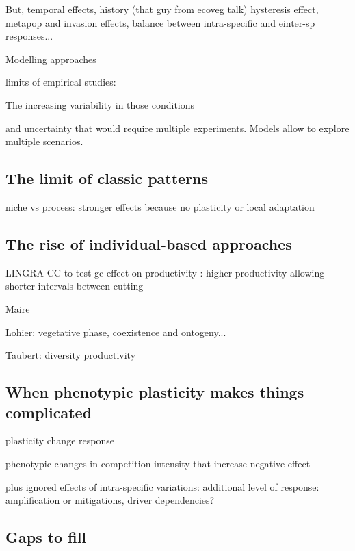  But, temporal effects, history (that guy from ecoveg talk) hysteresis effect, metapop and invasion effects, balance between intra-specific and einter-sp responses...
 
 Modelling approaches   
 
 
limits of empirical studies: \parencite{merila_climate_2014}

 
 \parencite{schirpke_multiple_2012}

 The increasing variability in those conditions 
 
 and uncertainty that would require multiple experiments. Models allow to explore multiple scenarios.

\subsection{The limit of classic patterns}

niche vs process: stronger effects because no plasticity or local adaptation \cite{morin_comparing_2009}
\subsection{The rise of individual-based approaches}

LINGRA-CC \cite{rodriguez_lingra-cc:_1999} to test gc effect on productivity : higher productivity allowing shorter intervals between cutting

Maire

Lohier: vegetative phase, coexistence and ontogeny... 

Taubert: diversity productivity 


\subsection{When phenotypic plasticity makes things complicated}

plasticity change response \cite{morin_comparing_2009}

phenotypic changes in competition intensity that increase negative effect \parencite{hanel_phenotypic_2015}

plus ignored effects of intra-specific variations: additional level of response: amplification or mitigations, driver dependencies?

\subsection{Gaps to fill}

